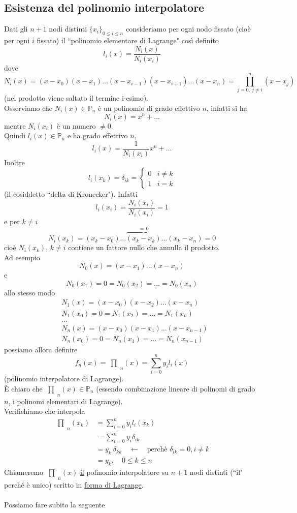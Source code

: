 \documentclass[12pt,headings=optiontohead]{article}
\newcommand{\inter}{\begin{matrix}\prod\end{matrix}}
\begin{document}
\subsection{Esistenza del polinomio interpolatore}
Dati gli $n+1$ nodi distinti $\{ x_i \}_{0 \leq i \leq n}$ consideriamo per ogni nodo fissato (cioè per ogni $i$ fissato) il ``polinomio elementare di Lagrange" così definito
\[ l_i(x) = \frac{N_i(x)}{N_i(x_i)} \]
dove
\[ N_i(x) = (x-x_0)(x-x_1) \dotso (x-x_{i-1})(x-x_{i+1}) \dotso (x-x_n) = \prod_{j=0, \ j\neq i}^n (x-x_j) \]
(nel prodotto viene saltato il termine i-esimo).\\
Osserviamo che $N_i(x) \in \mathbb{P}_n$ è un polinomio di grado effettivo $n$, infatti si ha
\[ N_i(x)=x^n+\dotso \]
mentre $N_i(x_i)$ è un numero $\ne 0$.\\
Quindi $l_i(x) \in \mathbb{P}_n$ e ha grado effettivo $n$,
\[ l_i(x) = \frac{1}{N_i(x_i)}x^n+\dotso \]
Inoltre
\[ l_i(x_k) = \delta_{ik} =
\begin{cases}
0 & i\ne k \\
1 & i=k 
\end{cases} \]
(il cosiddetto ``delta di Kronecker"). Infatti
\[ l_i(x_i) = \frac{N_i(x_i)}{N_i(x_i)} = 1 \]
e per $k\ne i$
\[ N_i(x_k) = (x_k-x_0)\dotso \overbrace{(x_k-x_k)}^{=\,0} \dotso (x_k-x_n) = 0 \]
cioè $N_i (x_k)$,  $k \neq i$ contiene un fattore nullo che annulla il prodotto.\\
Ad esempio 
\[ N_0 (x) = (x-x_1) \dotso (x-x_n) \]
e 
\[ N_0(x_1) = 0 = N_0(x_2) = \dotso = N_0(x_n) \]
allo stesso modo
\[ \begin{split}
    & N_1(x) = (x-x_0)(x-x_2) \dotso (x-x_n) \\
    & N_1(x_0) = 0 = N_1(x_2) = \dotso = N_1(x_n) \\
    & \dotso \\
    & N_n(x) = (x-x_0)(x-x_1) \dotso (x-x_{n-1}) \\
    & N_n(x_0) = 0 = N_n(x_1) = \dotso = N_n(x_{n-1})
\end{split} \]
possiamo allora definire
\[ f_n(x) = \inter_n(x) = \sum_{i=0}^n y_i l_i(x) \]
(polinomio interpolatore di Lagrange).\\
È chiaro che $\inter_n(x) \in \mathbb{P}_n$ (essendo combinazione lineare di polinomi di grado $n$, i polinomi elementari di Lagrange).\\
Verifichiamo che interpola
\[ \begin{split}
    \inter_n (x_k) & = \sum_{i=0}^n y_i l_i (x_k) \\
    & = \sum_{i=0}^n y_i \delta_{ik} \\
    & = y_k \ \delta_{kk} \quad \longleftarrow \quad \text{perchè } \delta_{ik}=0, i \ne k\\
    & = y_k, \quad 0 \leq k \leq n
\end{split} \]
Chiameremo $\inter_n(x)$ \uline{il} polinomio interpolatore su $n+1$ nodi distinti (``il" perché è unico) scritto in \uline{forma di Lagrange}.\\\\
Possiamo fare subito la seguente 
\end{document}
